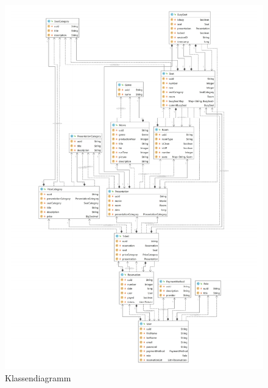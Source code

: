 		\begin{figure}[H]
			\centering 
			\includegraphics[width=15cm]{img/class_diagramm.pdf}
			\captionsetup{format=hang}
			\caption[Klassendiagramm]{\label{fig:Klassendiagramm}Klassendiagramm}
		\end{figure}
		
